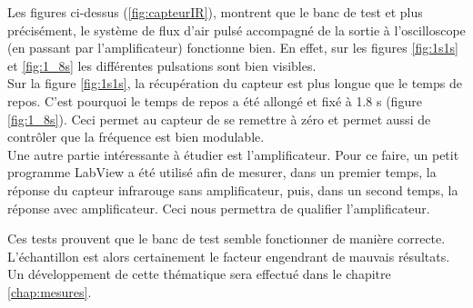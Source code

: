 Les figures ci-dessus (\ref{fig:capteurIR}), montrent que le banc de test et plus précisément, le système de flux d'air pulsé accompagné de
la sortie à l'oscilloscope (en passant par l'amplificateur) fonctionne bien. En effet, sur les figures \ref*{fig:1s1s} et \ref*{fig:1_8s}
les différentes pulsations sont bien visibles.\\

Sur la figure \ref{fig:1s1s}, la récupération du capteur est plus longue que le temps de repos. C'est pourquoi le temps de repos a été allongé
et fixé à 1.8 s (figure \ref*{fig:1_8s}). Ceci permet au capteur de se remettre à zéro et permet aussi de contrôler que la fréquence est bien
modulable. \\

Une autre partie intéressante à étudier est l'amplificateur. Pour ce faire, un petit programme LabView a été utilisé afin de mesurer, dans un
premier temps, la réponse du capteur \gls{infrarouge} sans amplificateur, puis, dans un second temps, la réponse avec amplificateur. Ceci nous
permettra de qualifier l'amplificateur.

Ces tests prouvent que le banc de test semble fonctionner de manière correcte. L'échantillon est alors certainement le facteur engendrant de
mauvais résultats. Un développement de cette thématique sera effectué dans le chapitre \ref{chap:mesures}.

\newpage
